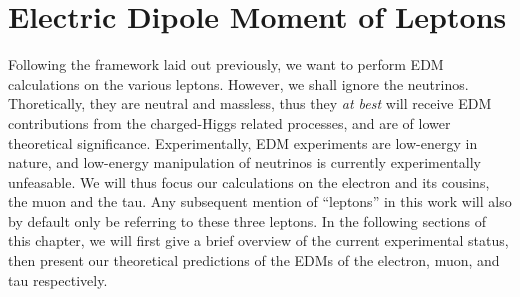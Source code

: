 \chapter{Electric Dipole Moment of Leptons}
\label{ch:leptonEDM}

Following the framework laid out previously, we want to perform EDM calculations on the various leptons.
However, we shall ignore the neutrinos. 
Thoretically, they are neutral and massless, thus they \emph{at best} will receive EDM contributions from the charged-Higgs related processes,
and are of lower theoretical significance.
Experimentally, EDM experiments are low-energy in nature, and low-energy manipulation of neutrinos is currently experimentally unfeasable.
We will thus focus our calculations on the electron and its cousins, the muon and the tau.
Any subsequent mention of ``leptons'' in this work will also by default only be referring to these three leptons. 
In the following sections of this chapter, we will first give a brief overview of the current experimental status,
then present our theoretical predictions of the EDMs of the electron, muon, and tau respectively.

